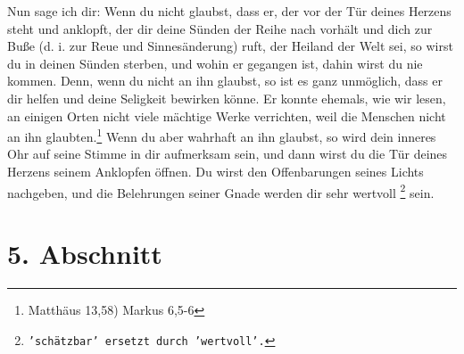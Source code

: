 Nun sage ich dir: Wenn du nicht glaubst, dass er, der vor der Tür deines Herzens
steht und anklopft, der dir deine Sünden der Reihe nach vorhält und dich zur
Buße (d. i. zur Reue und Sinnesänderung) ruft, der Heiland der Welt sei, so
wirst du in deinen Sünden sterben, und wohin er gegangen ist, dahin wirst du nie
kommen. Denn, wenn du nicht an ihn glaubst, so ist es ganz unmöglich, dass er
dir
helfen und deine Seligkeit bewirken könne. Er konnte ehemals, wie wir lesen, an
einigen Orten nicht viele mächtige Werke verrichten, weil die Menschen nicht an
ihn glaubten.\footnote{Matthäus 13,58) Markus 6,5-6}
Wenn du aber wahrhaft an ihn
glaubst, so wird dein inneres Ohr auf seine Stimme in dir aufmerksam sein, und
dann wirst du die Tür deines Herzens seinem Anklopfen öffnen. Du wirst den
Offenbarungen seines Lichts nachgeben, und die Belehrungen seiner Gnade werden
dir sehr wertvoll \footnote{\texttt{'schätzbar' ersetzt durch 'wertvoll'.}} sein.

\section{5. Abschnitt}  \label{kap2_ab5}

